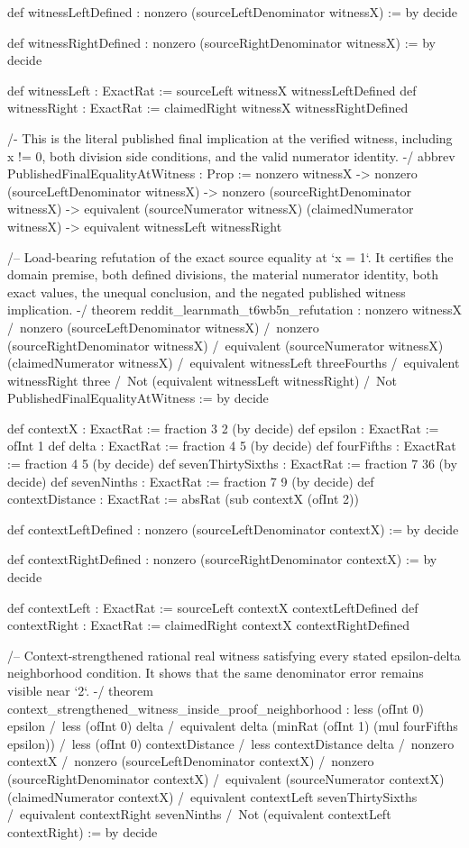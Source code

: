 \documentclass[11pt]{article}
\begin{document}
\begin{Vlean}
def witnessLeftDefined : nonzero (sourceLeftDenominator witnessX) := by
  decide

def witnessRightDefined : nonzero (sourceRightDenominator witnessX) := by
  decide

def witnessLeft : ExactRat := sourceLeft witnessX witnessLeftDefined
def witnessRight : ExactRat := claimedRight witnessX witnessRightDefined

/- This is the literal published final implication at the verified witness,
including x != 0, both division side conditions, and the valid numerator
identity. -/
abbrev PublishedFinalEqualityAtWitness : Prop :=
  nonzero witnessX ->
  nonzero (sourceLeftDenominator witnessX) ->
  nonzero (sourceRightDenominator witnessX) ->
  equivalent (sourceNumerator witnessX) (claimedNumerator witnessX) ->
  equivalent witnessLeft witnessRight

/-- Load-bearing refutation of the exact source equality at `x = 1`. It
certifies the domain premise, both defined divisions, the material numerator
identity, both exact values, the unequal conclusion, and the negated published
witness implication. -/
theorem reddit_learnmath_t6wb5n_refutation :
    nonzero witnessX /\
    nonzero (sourceLeftDenominator witnessX) /\
    nonzero (sourceRightDenominator witnessX) /\
    equivalent (sourceNumerator witnessX) (claimedNumerator witnessX) /\
    equivalent witnessLeft threeFourths /\
    equivalent witnessRight three /\
    Not (equivalent witnessLeft witnessRight) /\
    Not PublishedFinalEqualityAtWitness := by
  decide

def contextX : ExactRat := fraction 3 2 (by decide)
def epsilon : ExactRat := ofInt 1
def delta : ExactRat := fraction 4 5 (by decide)
def fourFifths : ExactRat := fraction 4 5 (by decide)
def sevenThirtySixths : ExactRat := fraction 7 36 (by decide)
def sevenNinths : ExactRat := fraction 7 9 (by decide)
def contextDistance : ExactRat := absRat (sub contextX (ofInt 2))

def contextLeftDefined : nonzero (sourceLeftDenominator contextX) := by
  decide

def contextRightDefined : nonzero (sourceRightDenominator contextX) := by
  decide

def contextLeft : ExactRat := sourceLeft contextX contextLeftDefined
def contextRight : ExactRat := claimedRight contextX contextRightDefined

/-- Context-strengthened rational real witness satisfying every stated
epsilon-delta neighborhood condition. It shows that the same denominator
error remains visible near `2`. -/
theorem context_strengthened_witness_inside_proof_neighborhood :
    less (ofInt 0) epsilon /\
    less (ofInt 0) delta /\
    equivalent delta (minRat (ofInt 1) (mul fourFifths epsilon)) /\
    less (ofInt 0) contextDistance /\
    less contextDistance delta /\
    nonzero contextX /\
    nonzero (sourceLeftDenominator contextX) /\
    nonzero (sourceRightDenominator contextX) /\
    equivalent (sourceNumerator contextX) (claimedNumerator contextX) /\
    equivalent contextLeft sevenThirtySixths /\
    equivalent contextRight sevenNinths /\
    Not (equivalent contextLeft contextRight) := by
  decide


\end{Vlean}
\end{document}
